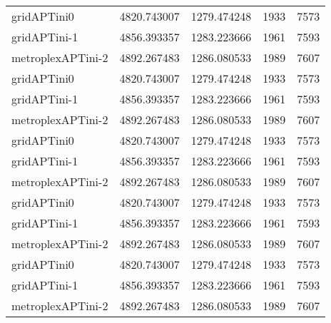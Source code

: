 \begin{table}[h]
\begin{longtable}{lrrrr}
gridAPTini0 & 4820.743007 & 1279.474248 & 1933 & 7573 \\
gridAPTini-1 & 4856.393357 & 1283.223666 & 1961 & 7593 \\
metroplexAPTini-2 & 4892.267483 & 1286.080533 & 1989 & 7607 \\
gridAPTini0 & 4820.743007 & 1279.474248 & 1933 & 7573 \\
gridAPTini-1 & 4856.393357 & 1283.223666 & 1961 & 7593 \\
metroplexAPTini-2 & 4892.267483 & 1286.080533 & 1989 & 7607 \\
gridAPTini0 & 4820.743007 & 1279.474248 & 1933 & 7573 \\
gridAPTini-1 & 4856.393357 & 1283.223666 & 1961 & 7593 \\
metroplexAPTini-2 & 4892.267483 & 1286.080533 & 1989 & 7607 \\
gridAPTini0 & 4820.743007 & 1279.474248 & 1933 & 7573 \\
gridAPTini-1 & 4856.393357 & 1283.223666 & 1961 & 7593 \\
metroplexAPTini-2 & 4892.267483 & 1286.080533 & 1989 & 7607 \\
gridAPTini0 & 4820.743007 & 1279.474248 & 1933 & 7573 \\
gridAPTini-1 & 4856.393357 & 1283.223666 & 1961 & 7593 \\
metroplexAPTini-2 & 4892.267483 & 1286.080533 & 1989 & 7607 \\
\end{longtable}
\end{table}

